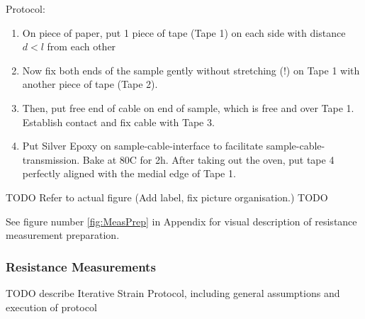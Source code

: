 Protocol:

\begin{enumerate}
    \item On piece of paper, put 1 piece of tape (Tape 1) on each side with distance $d < l$ from each other
    \item Now fix both ends of the sample gently without stretching (!) on Tape 1 with another piece of tape (Tape 2).
    \item Then, put free end of cable on end of sample, which is free and over Tape 1. Establish contact and fix cable with Tape 3.
    \item Put Silver Epoxy on sample-cable-interface to facilitate sample-cable-transmission. Bake at 80\textdegree C for 2h. After taking out the oven, put tape 4 perfectly aligned with the medial edge of Tape 1.
\end{enumerate}

    \begin{center}
    TODO
    Refer to actual figure (Add label, fix picture organisation.)
    TODO
    
See figure number \ref{fig:MeasPrep} in Appendix for visual description of resistance measurement preparation.
    \end{center}


\subsubsection{Resistance Measurements}
TODO describe Iterative Strain Protocol, including general assumptions and execution of protocol 